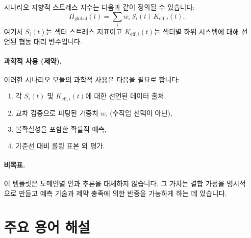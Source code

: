 \documentclass[13pt,a4paper]{article}
\begin{document}
시나리오 지향적 스트레스 지수는 다음과 같이 정의될 수 있습니다:
$$
\Pi_{\mathrm{global}}(t) = \sum_i w_i\,S_i(t)\,K_{\mathrm{eff},i}(t),
$$
여기서 $S_i(t)$는 섹터 스트레스 지표이고 $K_{\mathrm{eff},i}(t)$는 섹터별 하위 시스템에 대해 선언된 협동 대리 변수입니다.

\paragraph{과학적 사용 (제약).}
이러한 시나리오 모듈의 과학적 사용은 다음을 필요로 합니다:
\begin{enumerate}[leftmargin=*]
	\item 각 $S_i(t)$ 및 $K_{\mathrm{eff},i}(t)$에 대한 선언된 데이터 출처,
	\item 교차 검증으로 피팅된 가중치 $w_i$ (수작업 선택이 아닌),
	\item 불확실성을 포함한 확률적 예측,
	\item 기준선 대비 롤링 표본 외 평가.
\end{enumerate}

\paragraph{비목표.}
이 템플릿은 도메인별 인과 추론을 대체하지 않습니다. 그 가치는 결합 가정을 명시적으로 만들고 예측 기술과 제약 충족에 의한 반증을 가능하게 하는 데 있습니다.

\section*{주요 용어 해설}
\end{document}
